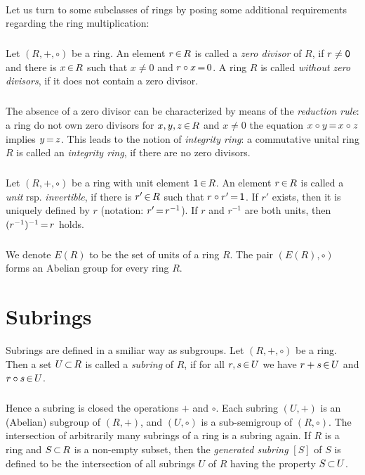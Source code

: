 \documentclass[11pt,twoside]{article}
\begin{document}
\paragraph{}
Let us turn to some subclasses of rings
by posing some additional requirements regarding the ring multiplication:

\subparagraph{}
Let $(R,+,\circ)$ be a ring.
An element $r {\,\in\,} R$ is called a \textit{zero divisor} of $R$,
if $r \neq {\mathsf{0}}$ and there is $x {\,\in\,} R$
such that $x \neq 0$ and $r \circ x {\,=\,} 0$.
A ring $R$ is called \textit{without zero divisors},
if it does not contain a zero divisor.

\subparagraph{}
The absence of a zero divisor can be characterized by means of
the \textit{reduction rule}:
a ring do not own zero divisors
\iff
for $x,y,z {\,\in\,} R$ and $x \neq 0$ the equation $x \circ y {\,=\,} x \circ z$
implies $y {\,=\,} z$.
This leads to the notion of \textit{integrity ring}:
a commutative unital ring $R$ is called an \textit{integrity ring},
if there are no zero divisors.

\subparagraph{}
Let $(R,+,\circ)$ be a ring with unit element ${\mathsf{1}} {\,\in\,} R$.
An element $r {\,\in\,} R$ is called a \textit{unit} rsp. \textit{invertible},
if there is $r' {\,\in\,} R$ such that $r \circ r' {\,=\,} {\mathsf{1}}$.
If $r'$ exists, then it is uniquely defined by $r$
(notation: $r' {\,=\,} r^{-1}$).
If $r$ and $r^{-1}$ are both units, then $(r^{-1})^{-1} {\,=\,} r$ holds.

\subparagraph{}
We denote $E(R)$ to be the set of units of a ring $R$.
The pair $(E(R),\circ)$ forms an Abelian group for every ring $R$.

\section{Subrings}
Subrings are defined in a smiliar way as subgroups.
Let $(R,+,\circ)$ be a ring.
Then a set $U {\,\subset\,} R$ is called a \textit{subring} of $R$, 
if for all $r,s {\,\in\,} U$ we have $r+s {\,\in\,} U$ and $r \circ s {\,\in\,} U$.

\subparagraph{}
Hence a subring is closed {\wrt} the operations $+$ and $\circ$.
Each subring $(U,+)$ is an (Abelian) subgroup of $(R,+)$,
and $(U,\circ)$ is a sub-semigroup of $(R,\circ)$.
The intersection of arbitrarily many subrings of a ring is a subring again.
If $R$ is a ring and $S {\,\subset\,} R$ is a non-empty subset,
then the \textit{generated subring} $[S]$ of $S$ is defined
to be the intersection of all subrings $U$ of $R$
having the property $S {\,\subset\,} U$.
\end{document}
